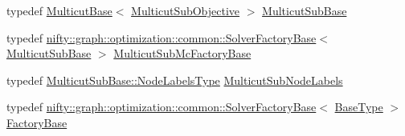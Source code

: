 \begin{DoxyCompactItemize}
\item 
typedef \hyperlink{classnifty_1_1graph_1_1optimization_1_1multicut_1_1MulticutBase}{Multicut\+Base}$<$ \hyperlink{classnifty_1_1graph_1_1optimization_1_1multicut_1_1Cgc_a437e2332f586cdb3f4ee55e3cf1ea224}{Multicut\+Sub\+Objective} $>$ \hyperlink{classnifty_1_1graph_1_1optimization_1_1multicut_1_1Cgc_a9bd82569e6729554ef0a07ad57f2bd94}{Multicut\+Sub\+Base}
\item 
typedef \hyperlink{classnifty_1_1graph_1_1optimization_1_1common_1_1SolverFactoryBase}{nifty\+::graph\+::optimization\+::common\+::\+Solver\+Factory\+Base}$<$ \hyperlink{classnifty_1_1graph_1_1optimization_1_1multicut_1_1Cgc_a9bd82569e6729554ef0a07ad57f2bd94}{Multicut\+Sub\+Base} $>$ \hyperlink{classnifty_1_1graph_1_1optimization_1_1multicut_1_1Cgc_a5516da27348db37b794d25628deb9e82}{Multicut\+Sub\+Mc\+Factory\+Base}
\item 
typedef \hyperlink{classnifty_1_1graph_1_1optimization_1_1common_1_1SolverBase_a6e4e465f3b6e039882669fcfb9714818}{Multicut\+Sub\+Base\+::\+Node\+Labels\+Type} \hyperlink{classnifty_1_1graph_1_1optimization_1_1multicut_1_1Cgc_a8a87ee61f8ce21292822f91e1f71c8d3}{Multicut\+Sub\+Node\+Labels}
\item 
typedef \hyperlink{classnifty_1_1graph_1_1optimization_1_1common_1_1SolverFactoryBase}{nifty\+::graph\+::optimization\+::common\+::\+Solver\+Factory\+Base}$<$ \hyperlink{classnifty_1_1graph_1_1optimization_1_1multicut_1_1Cgc_aa973cf9cceaa9e15ea351036f3c81fdf}{Base\+Type} $>$ \hyperlink{classnifty_1_1graph_1_1optimization_1_1multicut_1_1Cgc_af4275240831bf3922200609cab98fc1b}{Factory\+Base}
\end{DoxyCompactItemize}
